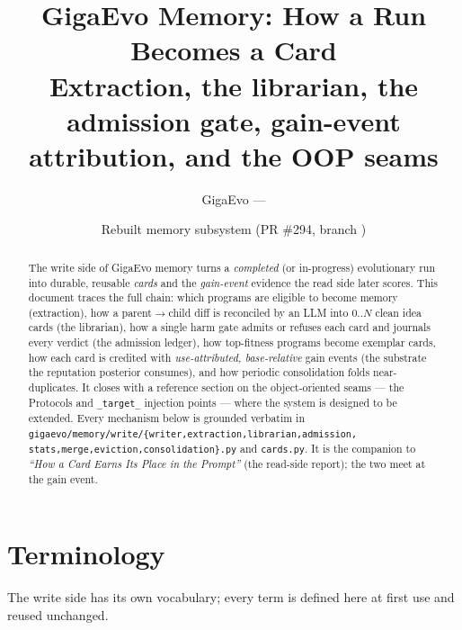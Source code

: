 \documentclass[11pt]{article}
\title{\textbf{GigaEvo Memory: How a Run Becomes a Card}\\[2pt]
\large Extraction, the librarian, the admission gate, gain-event attribution, and the OOP seams}
\author{GigaEvo --- \code{gigaevo/memory/write}}
\date{Rebuilt memory subsystem (PR \#294, branch \code{refactor/memory-rebuild})}
\newcommand{\code}[1]{\texttt{\small #1}}
\begin{document}
\maketitle

\begin{abstract}
The write side of GigaEvo memory turns a \emph{completed} (or in-progress)
evolutionary run into durable, reusable \emph{cards} and the \emph{gain-event}
evidence the read side later scores. This document traces the full chain: which
programs are eligible to become memory (extraction), how a parent$\to$child diff
is reconciled by an LLM into 0..$N$ clean idea cards (the librarian), how a
single harm gate admits or refuses each card and journals every verdict (the
admission ledger), how top-fitness programs become exemplar cards, how each
card is credited with \emph{use-attributed, base-relative} gain events
(the substrate the reputation posterior consumes), and how periodic
consolidation folds near-duplicates. It closes with a reference section on the
object-oriented seams --- the Protocols and \code{\_target\_} injection points ---
where the system is designed to be extended. Every mechanism below is grounded
verbatim in \code{gigaevo/memory/write/\{writer,extraction,librarian,admission,
stats,merge,eviction,consolidation\}.py} and \code{cards.py}. It is the companion
to \emph{``How a Card Earns Its Place in the Prompt''} (the read-side report);
the two meet at the gain event.
\end{abstract}

\section*{Terminology}

The write side has its own vocabulary; every term is defined here at first use
and reused unchanged.
\end{document}
